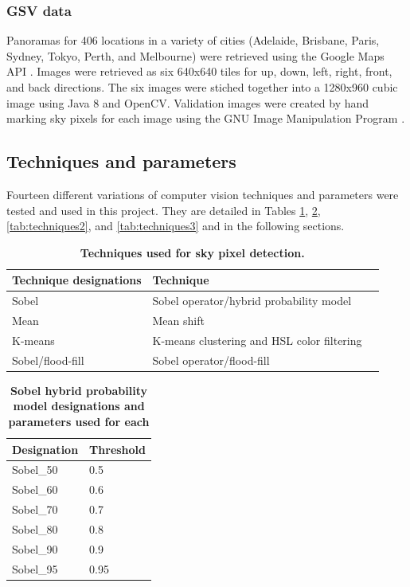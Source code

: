 \documentclass[final,3p,times,authoryear]{elsarticle}
\begin{document}
\subsubsection{GSV data}\label{sec:gsvdata}
Panoramas for 406 locations in a variety of cities (Adelaide, Brisbane, Paris, Sydney, Tokyo, Perth, and Melbourne) were retrieved using the Google Maps API \citep{GoogleMaps2017b}. Images were retrieved as six 640x640 tiles for up, down, left, right, front, and back directions. The six images were stiched together into a 1280x960 cubic image using Java 8 \citep{Oracle2018} and OpenCV\citep {Bradski2000}. Validation images were created by hand marking sky pixels for each image using the GNU Image Manipulation Program \citep{GIMP2019}.

\subsection{Techniques and parameters}
Fourteen different variations of computer vision techniques and parameters were tested and used in this project. They are detailed in Tables \ref{tab:techniques}, \ref{tab:techniques4}, \ref{tab:techniques2}, and \ref{tab:techniques3} and in the following sections.

\begin{table}[!htbp]
\caption{\bf Techniques used for sky pixel detection.  \label{tab:techniques}}     
\begin{tabular}{ l  l l}
\textbf{Technique designations} & \textbf{Technique}  \\ \hline
Sobel  & Sobel operator/hybrid probability model \\	
Mean &  Mean shift \\
K-means  & K-means clustering and HSL color filtering \\
Sobel/flood-fill  & Sobel operator/flood-fill \\
\hline
\end{tabular}
\end{table}

\begin{table}[!htbp]
\caption{\bf Sobel hybrid probability model designations and parameters used for each  \label{tab:techniques4}}     
\begin{tabular}{ l  l }
\textbf{Designation}  & \textbf{Threshold}    \\ \hline
Sobel\_50 & 0.5 \\	  
Sobel\_60 & 0.6 \\	
Sobel\_70 & 0.7 \\	
Sobel\_80 & 0.8 \\
Sobel\_90 & 0.9 \\
Sobel\_95 & 0.95 \\
\hline
\end{tabular}
\end{table}
\end{document}
